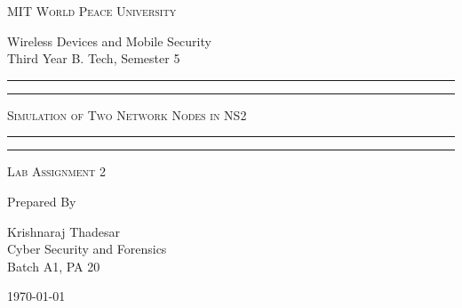 \documentclass[11pt]{article}
\begin{document}
\begin{titlepage}
    \centering


    \huge\textsc{
        MIT World Peace University
    }\\

    \vspace{0.75\baselineskip} %

    \LARGE{
        Wireless Devices and Mobile Security\\
        Third Year B. Tech, Semester 5
    }

    \vfill %


    \rule{\textwidth}{1.6pt}\vspace*{-\baselineskip}\vspace*{2pt}
    \rule{\textwidth}{0.6pt}
    \vspace{0.75\baselineskip} %



    \huge{\textsc{
            Simulation of Two Network Nodes in NS2
        }} \\



    \vspace{0.5\baselineskip} %
    \rule{\textwidth}{0.6pt}\vspace*{-\baselineskip}\vspace*{2.8pt}
    \rule{\textwidth}{1.6pt}

    \vspace{1\baselineskip} %


    \LARGE\textsc{
        Lab Assignment 2
    } %
    \vfill


    Prepared By
    \vspace{0.5\baselineskip} %

    \Large{
        Krishnaraj Thadesar \\
        Cyber Security and Forensics\\
        Batch A1, PA 20
    }


    \vspace{0.5\baselineskip} %
    \today

\end{titlepage}
\end{document}
